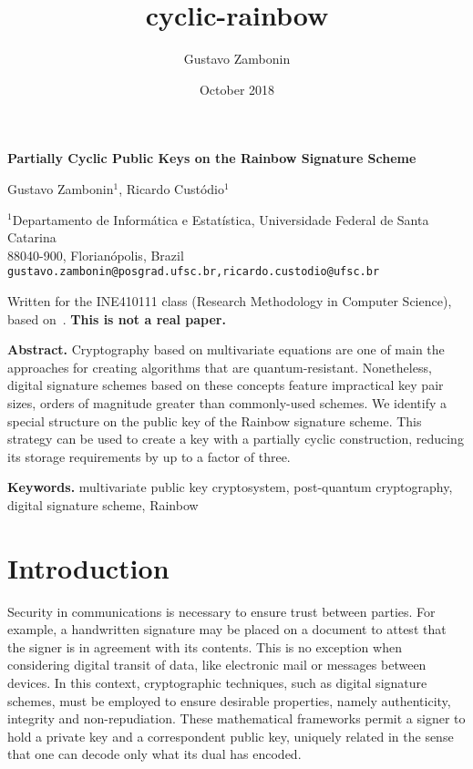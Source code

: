 \documentclass[a4paper, 14pt]{extarticle}
\title{cyclic-rainbow}
\author{Gustavo Zambonin}
\date{October 2018}
\begin{document}
\begin{center}
    {\Large\bf Partially Cyclic Public Keys on the Rainbow Signature Scheme} \vspace{.75cm}
    
    Gustavo Zambonin$^{1}$, Ricardo Custódio$^{1}$
    
    $^{1}$Departamento de Informática e Estatística, Universidade Federal de Santa Catarina \\
    88040-900, Florianópolis, Brazil \\
    \texttt{gustavo.zambonin@posgrad.ufsc.br,ricardo.custodio@ufsc.br}
    
     Written for the INE410111 class (Research Methodology in Computer Science), based on~\cite{Petzoldt:phd:2013:jul}. \textbf{This is not a real paper.} \vspace{.75cm}
\end{center}

\textbf{Abstract.} Cryptography based on multivariate equations are one of main the approaches for creating algorithms that are quantum-resistant. Nonetheless, digital signature schemes based on these concepts feature impractical key pair sizes, orders of magnitude greater than commonly-used schemes. We identify a special structure on the public key of the Rainbow signature scheme. This strategy can be used to create a key with a partially cyclic construction, reducing its storage requirements by up to a factor of three.

\textbf{Keywords.} multivariate public key cryptosystem, post-quantum cryptography, digital signature scheme, Rainbow

\section{Introduction}

Security in communications is necessary to ensure trust between parties. For example, a handwritten signature may be placed on a document to attest that the signer is in agreement with its contents. This is no exception when considering digital transit of data, like electronic mail or messages between devices. In this context, cryptographic techniques, such as digital signature schemes, must be employed to ensure desirable properties, namely authenticity, integrity and non-repudiation. These mathematical frameworks permit a signer to hold a private key and a correspondent public key, uniquely related in the sense that one can decode only what its dual has encoded. 
\end{document}

